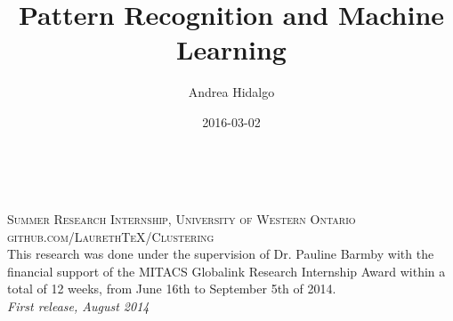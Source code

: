 \documentclass[11pt,fleqn]{book} %
\begin{document}
\title{Pattern Recognition and Machine Learning}
\author{Andrea Hidalgo}
\date{2016-03-02}
\makecover

\maketitle



\newpage
~\vfill
\thispagestyle{empty}


\noindent \textsc{Summer Research Internship, University of Western Ontario}\\

\noindent \textsc{github.com/LaurethTeX/Clustering}\\ %

\noindent This research was done under the supervision of Dr. Pauline Barmby with the financial support of the MITACS Globalink Research Internship Award within a total of 12 weeks, from June 16th to September 5th of 2014. \\ %

\noindent \textit{First release, August 2014} %



\pagestyle{empty} %

\tableofcontents %


\pagestyle{fancy} %

\end{document}
